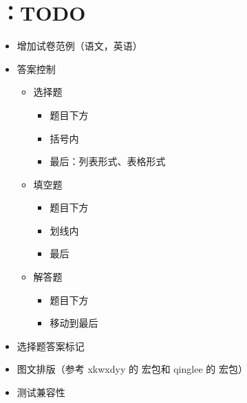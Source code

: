 \documentclass{xdyydoc}
\begin{document}


\maketitle






\tableofcontents


















\section{：TODO}

\begin{itemize}
  \item 增加试卷范例（语文，英语）
  \item 答案控制
    \begin{itemize}
      \item 选择题
        \begin{itemize}
          \item 题目下方
          \item 括号内
          \item 最后：列表形式、表格形式
        \end{itemize}
      \item 填空题
        \begin{itemize}
          \item 题目下方
          \item 划线内
          \item 最后
        \end{itemize}
      \item 解答题
        \begin{itemize}
          \item 题目下方
          \item 移动到最后
        \end{itemize}
    \end{itemize}
  \item 选择题答案标记
  \item 图文排版（参考 xkwxdyy 的  宏包和 qinglee 的  宏包）
  \item 测试兼容性
\end{itemize}
\end{document}
